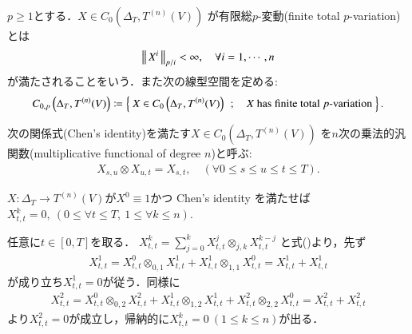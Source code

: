 	\begin{screen}
		\begin{dfn}[有限総$p$-変動]
			$p \geq 1$とする．$X \in C_0 \left(\Delta_T,T^{(n)}(V) \right)$
			が有限総$p$-変動(finite total $p$-variation)とは
			\begin{align}
				\left\|\, X^i\, \right\|_{p/i} < \infty,
				\quad \forall i=1,\cdots,n
			\end{align}
			が満たされることをいう．また次の線型空間を定める:
			\begin{align}
				C_{0,p} \left(\Delta_T,T^{(n)}(V) \right)
				\coloneqq \left\{\ X \in C_0 \left(\Delta_T,T^{(n)}(V) \right)\ \, ; \quad \mbox{$X$ has finite total $p$-variation}\ \right\}	.
			\end{align}
		\end{dfn}
	\end{screen}
	
	\begin{screen}
		\begin{dfn}[乗法的汎関数]
			次の関係式(Chen's identity)を満たす$X \in C_0 \left(\Delta_T,T^{(n)}(V) \right)$
			を$n$次の乗法的汎関数(multiplicative functional of degree $n$)と呼ぶ:
			\begin{align}
				X_{s,u} \otimes X_{u,t} = X_{s,t},
				\quad (\forall 0 \leq s \leq u \leq t \leq T).
			\end{align}
		\end{dfn}
	\end{screen}
	
	\begin{screen}
		\begin{lem}\label{lem:multiplicative_functional_vanishes_on_diagonal}
			$X:\Delta_T \longrightarrow T^{(n)}(V)$が$X^0 \equiv 1$かつ
			Chen's identity を満たせば$X^k_{t,t} = 0,
			\ (0 \leq \forall t \leq T,\ 1 \leq \forall k \leq n)$.
		\end{lem}
	\end{screen}
	
	\begin{prf}
		任意に$t \in [0,T]$を取る．
		$X^k_{t,t} = \sum_{j=0}^{k} X^j_{t,t} \otimes_{j,k} X^{k-j}_{t,t}$
		と式()より，先ず
		\begin{align}
			X^1_{t,t} = X^0_{t,t} \otimes_{0,1} X^1_{t,t} + X^1_{t,t} \otimes_{1,1} X^0_{t,t}
			= X^1_{t,t} + X^1_{t,t}
		\end{align}
		が成り立ち$X^1_{t,t} = 0$が従う．同様に
		\begin{align}
			X^2_{t,t} = X^0_{t,t} \otimes_{0,2} X^2_{t,t} + X^1_{t,t} \otimes_{1,2} X^1_{t,t}
				+ X^2_{t,t} \otimes_{2,2} X^0_{t,t}
			= X^2_{t,t} + X^2_{t,t}
		\end{align}
		より$X^2_{t,t} = 0$が成立し，帰納的に$X^k_{t,t} = 0\ (1 \leq k \leq n)$が出る．
		\QED
	\end{prf}
	
